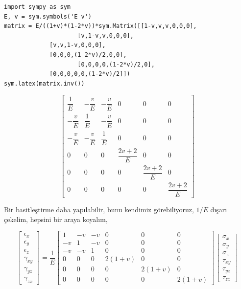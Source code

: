 \documentclass[12pt,fleqn]{article}\usepackage{../../common}
\begin{document}
\begin{verbatim}
import sympy as sym
E, v = sym.symbols('E v')
matrix = E/((1+v)*(1-2*v))*sym.Matrix([[1-v,v,v,0,0,0],
                     [v,1-v,v,0,0,0],
		     [v,v,1-v,0,0,0],
		     [0,0,0,(1-2*v)/2,0,0],
                     [0,0,0,0,(1-2*v)/2,0],
		     [0,0,0,0,0,(1-2*v)/2]])
sym.latex(matrix.inv())
\end{verbatim}


$$
\left[\begin{matrix}\dfrac{1}{E} & - \dfrac{v}{E} & - \dfrac{v}{E} & 0 & 0 & 0\\- \dfrac{v}{E} & \dfrac{1}{E} & - \dfrac{v}{E} & 0 & 0 & 0\\- \dfrac{v}{E} & - \dfrac{v}{E} & \dfrac{1}{E} & 0 & 0 & 0\\0 & 0 & 0 & \dfrac{2 v + 2}{E} & 0 & 0\\0 & 0 & 0 & 0 & \dfrac{2 v + 2}{E} & 0\\0 & 0 & 0 & 0 & 0 & \dfrac{2 v + 2}{E}\end{matrix}\right]
$$

Bir basitleştirme daha yapılabilir, bunu kendimiz görebiliyoruz, $1/E$ dışarı
çekelim, hepsini bir araya koyalım,

$$
\left[\begin{array}{c}
\epsilon_x \\ \epsilon_y \\ \epsilon_z \\ \gamma_{xy} \\ \gamma_{yz} \\ \gamma_{zx}
\end{array}\right] =
\frac{1}{E}
\left[\begin{array}{cccccc}
1 & -v & -v & 0 & 0 & 0 \\
-v & 1 & -v & 0 & 0 & 0 \\
-v & -v & 1 & 0 & 0 & 0 \\
0 & 0 & 0 & 2(1+v) & 0 & 0 \\
0 & 0 & 0 & 0 & 2(1+v) & 0 \\
0 & 0 & 0 & 0 & 0 & 2(1+v)
\end{array}\right]
\left[\begin{array}{c}
\sigma_x \\ \sigma_y \\ \sigma_z \\ \tau_{xy} \\ \tau_{yz} \\ \tau_{zx}
\end{array}\right]
$$
\end{document}
